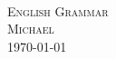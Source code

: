 \begin{center}
\LARGE{\textsc{ \\
English Grammar}} \\
\vspace{2.3cm}
\Large{\textsc{Michael}} \\
\vspace{2.3cm}
\today
\end{center}
